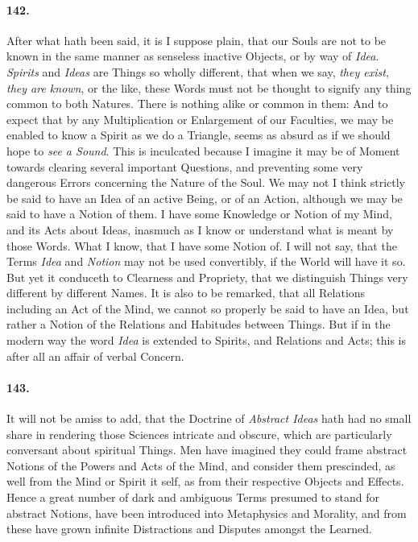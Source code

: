 \documentclass[]{article}
\newenvironment{sectionbody}{}{}
\begin{document}
\begin{sectionbody}
\paragraph{142.} After what hath been said, it is I suppose plain, that our Souls
are not to be known in the same manner as senseless inactive
Objects, or by way of \emph{Idea}. \emph{Spirits} and
\emph{Ideas} are Things so wholly different, that when we say,
\emph{they exist}, \emph{they are known}, or the like, these
Words must not be thought to signify any thing common to both
Natures.  There is nothing alike or common in them: And to expect
that by any Multiplication or Enlargement of our Faculties, we
may be enabled to know a Spirit as we do a Triangle, seems as
absurd as if we should hope to \emph{see a Sound}.  This is
inculcated because I imagine it may be of Moment towards clearing
several important Questions, and preventing some very dangerous
Errors concerning the Nature of the Soul.  We may not I think
strictly be said to have an Idea of an active Being, or
of an Action, although we may be said to have a Notion
of them.  I have some Knowledge or Notion of my Mind, and its
Acts about Ideas, inasmuch as I know or understand what is meant
by those Words.  What I know, that I have some Notion of.  I will
not say, that the Terms \emph{Idea} and \emph{Notion} may not
be used convertibly, if the World will have it so.  But yet it
conduceth to Clearness and Propriety, that we distinguish Things
very different by different Names.  It is also to be remarked,
that all Relations including an Act of the Mind, we cannot so
properly be said to have an Idea, but rather a Notion of the
Relations and Habitudes between Things.  But if in the modern way
the word \emph{Idea} is extended to Spirits, and Relations and
Acts; this is after all an affair of verbal Concern.



\paragraph{143.} It will not be amiss to add, that the Doctrine of \emph{Abstract
Ideas} hath had no small share in rendering those Sciences
intricate and obscure, which are particularly conversant about
spiritual Things.  Men have imagined they could frame abstract
Notions of the Powers and Acts of the Mind, and consider them
prescinded, as well from the Mind or Spirit it self, as from
their respective Objects and Effects.  Hence a great number of
dark and ambiguous Terms presumed to stand for abstract Notions,
have been introduced into Metaphysics and Morality, and from
these have grown infinite Distractions and Disputes amongst the
Learned.




\end{sectionbody}
\end{document}
